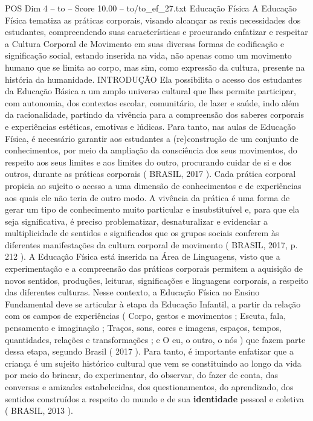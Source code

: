\begin{textsample}{POS Dim 4 – to – Score 10.00 – to/to\_ef\_27.txt}  \label{ex:f4_pos_203}
Educação Física A Educação Física tematiza as práticas corporais, visando alcançar as reais necessidades dos estudantes, compreendendo suas características e procurando enfatizar e respeitar a Cultura Corporal de Movimento em suas diversas formas de codificação e significação social, estando inserida na vida, não apenas como um movimento humano que se limita ao corpo, mas sim, como expressão da cultura, presente na história da humanidade.
INTRODUÇÃO Ela possibilita o acesso dos estudantes da Educação Básica a um amplo universo cultural que lhes permite participar, com autonomia, dos contextos escolar, comunitário, de lazer e saúde, indo além da racionalidade, partindo da vivência para a compreensão dos saberes corporais e experiências estéticas, emotivas e lúdicas.
Para tanto, nas aulas de Educação Física, é necessário garantir aos estudantes a (re)construção de um conjunto de conhecimentos, por meio da ampliação da consciência dos seus movimentos, do respeito aos seus limites e aos limites do outro, procurando cuidar de si e dos outros, durante as práticas corporais ( BRASIL, 2017 ).
Cada prática corporal propicia ao sujeito o acesso a uma dimensão de conhecimentos e de experiências aos quais ele não teria de outro modo.
A vivência da prática é uma forma de gerar um tipo de conhecimento muito particular e insubstituível e, para que ela seja significativa, é preciso problematizar, desnaturalizar e evidenciar a multiplicidade de sentidos e significados que os grupos sociais conferem às diferentes manifestações da cultura corporal de movimento ( BRASIL, 2017, p. 212 ).
A Educação Física está inserida na Área de Linguagens, visto que a experimentação e a compreensão das práticas corporais permitem a aquisição de novos sentidos, produções, leituras, significações e linguagens corporais, a respeito das diferentes culturas.
Nesse contexto, a Educação Física no Ensino Fundamental deve se articular à etapa da Educação Infantil, a partir da relação com os campos de experiências ( Corpo, gestos e movimentos ; Escuta, fala, pensamento e imaginação ; Traços, sons, cores e imagens, espaços, tempos, quantidades, relações e transformações ; e O eu, o outro, o nós ) que fazem parte dessa etapa, segundo Brasil ( 2017 ).
Para tanto, é importante enfatizar que a criança é um sujeito histórico cultural que vem se constituindo ao longo da vida por meio do brincar, do experimentar, do observar, do fazer de conta, das conversas e amizades estabelecidas, dos questionamentos, do aprendizado, dos sentidos construídos a respeito do mundo e de sua \textbf{identidade} pessoal e coletiva ( BRASIL, 2013 ).

\end{textsample}
